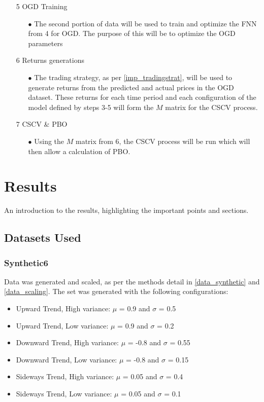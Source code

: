 \documentclass[a4paper,latin]{paper}
\begin{document}
\begin{itemize}
\begin{itemize}
	\end{itemize}			
	\item [5] OGD Training
	\begin{itemize}
		\item[$\bullet$] The second portion of data will be used to train and optimize the FNN from 4 for OGD. The purpose of this will be to optimize the OGD parameters		
	\end{itemize}			
	\item [6] Returns generations
	\begin{itemize}
		\item[$\bullet$] The trading strategy, as per \ref{imp_tradingstrat}, will be used to generate returns from the predicted and actual prices in the OGD dataset. These returns for each time period and each configuration of the model defined by steps 3-5 will form the $M$ matrix for the CSCV process.
	\end{itemize}	
	\item [7] CSCV \& PBO
	\begin{itemize}
		\item[$\bullet$] Using the $M$ matrix from 6, the CSCV process will be run which will then allow a calculation of PBO.
	\end{itemize}		
\end{itemize}


\newpage
\section{Results}\label{Results}

An introduction to the results, highlighting the important points and sections.

\subsection{Datasets Used}

\subsubsection{Synthetic6} \label{dataset_synthetic6}

Data was generated and scaled, as per the methods detail in \ref{data_synthetic} and \ref{data_scaling}. The set was generated with the following configurations:
\begin{itemize}
	\item Upward Trend, High variance: $\mu$ = 0.9 and $\sigma$ = 0.5
	\item Upward Trend, Low variance:  $\mu$ = 0.9 and $\sigma$ = 0.2
	\item Downward Trend, High variance:  $\mu$ = -0.8 and $\sigma$ = 0.55
	\item Downward Trend, Low variance:  $\mu$ = -0.8 and $\sigma$ = 0.15
	\item Sideways Trend, High variance:  $\mu$ = 0.05 and $\sigma$ = 0.4
	\item Sideways Trend, Low variance:  $\mu$ = 0.05 and $\sigma$ = 0.1			
\end{itemize}
\end{document}
